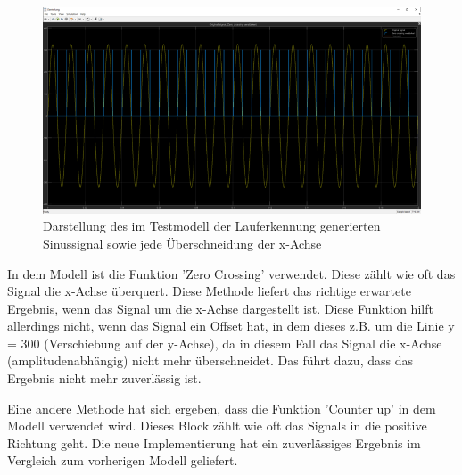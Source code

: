 \begin{figure}[H] %
	\centering
	\includegraphics[width=\linewidth]{Bilder/Lauferkennung_Peaks_SinusSignal.png}
	\caption{Darstellung des im Testmodell der Lauferkennung generierten Sinussignal sowie jede Überschneidung der x-Achse}
	\label{fig:Lauferkennung_Peaks_SinusSignal}
\end{figure}

In dem Modell ist die Funktion 'Zero Crossing' verwendet. Diese zählt wie oft das Signal die x-Achse überquert. Diese Methode liefert das richtige erwartete Ergebnis, wenn das Signal um die x-Achse dargestellt ist. Diese Funktion hilft allerdings nicht, wenn das Signal ein Offset hat, in dem dieses z.B. um die Linie y = 300 (Verschiebung auf der y-Achse), da in diesem Fall das Signal die x-Achse (amplitudenabhängig) nicht mehr überschneidet. Das führt dazu, dass das Ergebnis nicht mehr zuverlässig ist.

Eine andere Methode hat sich ergeben, dass die Funktion 'Counter up' in dem Modell verwendet wird. Dieses Block zählt wie oft das Signals in die positive Richtung geht. Die neue Implementierung hat ein zuverlässiges Ergebnis im Vergleich zum vorherigen Modell geliefert. %

